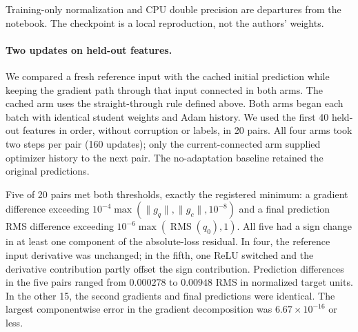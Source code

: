 \documentclass[11pt,a4paper]{article}
\begin{document}
Training-only normalization and CPU double precision are departures from the
notebook. The checkpoint is a local reproduction, not the authors' weights.

\paragraph{Two updates on held-out features.}
We compared a fresh reference input with the cached initial prediction while
keeping the gradient path through that input connected in both arms. The
cached arm uses the straight-through rule defined above. Both arms began
each batch with identical student weights and Adam history. We used the first
40 held-out features in order, without corruption or labels, in 20 pairs.
All four arms took two steps per pair (160 updates); only the current-connected
arm supplied optimizer history to the next pair. The no-adaptation baseline
retained the original predictions.

Five of 20 pairs met both thresholds, exactly the registered minimum:
a gradient difference exceeding $10^{-4}\max(\|g_q\|,\|g_c\|,10^{-8})$
and a final prediction RMS difference exceeding
$10^{-6}\max(\operatorname{RMS}(q_0),1)$. All five had a sign change in
at least one component of the absolute-loss residual. In four, the reference
input derivative was unchanged; in the fifth, one ReLU switched and the
derivative contribution partly offset the sign contribution. Prediction
differences in the five pairs ranged from $0.000278$ to $0.00948$ RMS
in normalized target units. In the other 15, the second gradients and
final predictions were identical. The largest componentwise error in the
gradient decomposition was $6.67\times10^{-16}$ or less.
\end{document}
